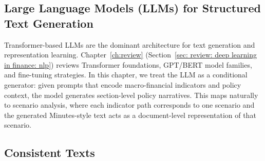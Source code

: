 \subsection*{Large Language Models (LLMs) for Structured Text Generation}\label{ch2:sec:lr:llm}

Transformer-based LLMs are the dominant architecture for text generation and representation learning. Chapter~\ref{ch:review} (Section~\ref{sec: review: deep learning in finance: nlp}) reviews Transformer foundations, GPT/BERT model families, and fine-tuning strategies. In this chapter, we treat the LLM as a conditional generator: given prompts that encode macro-financial indicators and policy context, the model generates section-level policy narratives. This maps naturally to scenario analysis, where each indicator path corresponds to one scenario and the generated Minutes-style text acts as a document-level representation of that scenario.

\subsection*{Consistent Texts}\label{ch2:sec:lr:text}

